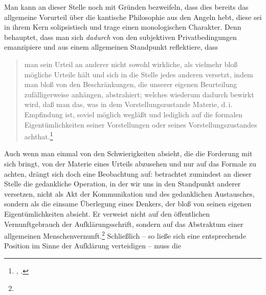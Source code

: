 Man kann an dieser Stelle noch mit Gründen bezweifeln, dass dies bereits das
allgemeine Vorurteil über die kantische Philosophie aus den Angeln
hebt, diese sei in ihrem Kern solipsistisch und trage einen monologischen
Charakter. Denn  behauptet, dass man sich \emph{dadurch}
von den subjektiven Privatbedingungen emanzipiere und aus einem allgemeinen
Standpunkt reflektiere, dass
\begin{quote}
  man sein Urteil an anderer nicht sowohl wirkliche, als vielmehr bloß mögliche
  Urteile hält und sich in die Stelle jedes anderen versetzt, indem man bloß von
  den Beschränkungen, die unserer eigenen Beurteilung zufälligerweise anhängen,
  abstrahiert; welches wiederum dadurch bewirkt wird, daß man das, was in dem
  Vorstellungszustande Materie, {d.\,i.} Empfindung ist, soviel möglich wegläßt
  und lediglich auf die formalen Eigentümlichkeiten seiner Vorstellungen oder
  seines Vorstellungszustandes
  achthat.\footnote{\cite[\S~40]{Kant:KritikderUrteilskraft2009}, \cite[V:
  294.1--8]{Kant:GesammelteWerke1900ff.}.}
\end{quote}
Auch wenn man einmal von den Schwierigkeiten absieht, die die Forderung mit sich
bringt, von der Materie eines Urteils abzusehen und nur auf das Formale zu
achten, drängt sich doch eine Beobachtung auf:  betrachtet
zumindest an dieser Stelle die gedankliche Operation, in der wir uns in den Standpunkt anderer
versetzen, nicht als Akt der Kommunikation und des gedanklichen Austausches, sondern als die einsame
Überlegung eines Denkers, der bloß von seinen eigenen Eigentümlichkeiten
absieht. Er verweist nicht auf den öffentlichen Vernunftgebrauch der
Aufklärungsschrift, sondern auf das Abstraktum einer allgemeinen
Menschenvernunft.\footnote{} Schließlich -- so ließe
sich eine entsprechende Position im Sinne der Aufklärung verteidigen -- muss die

